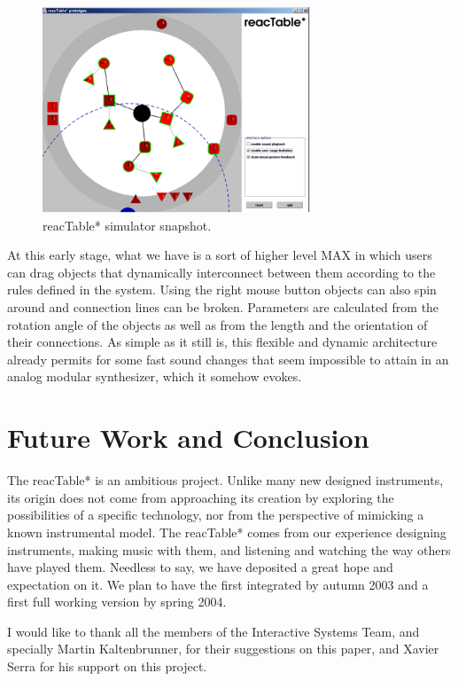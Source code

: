 \begin{figure}[t]
\centering
\includegraphics[width=8cm]{Fig8.png}
\caption{reacTable*  simulator snapshot.}
\label{Jorda:fig:reactable-simulator} 
\end{figure}

At this early stage, what we have is  a sort  of higher  level MAX in which
users can drag objects that dynamically interconnect between them according to 
the  rules  defined  in the system. Using the right mouse button objects can
also spin around and connection lines can be broken. Parameters are calculated
from the  rotation angle of  the  objects as  well  as from the length and the orientation of their connections. As simple as it still is, this flexible and dynamic architecture already permits for some fast sound changes that seem impossible to attain in an analog modular synthesizer, which it somehow evokes.

\section {Future Work and Conclusion}

The reacTable*  is an ambitious project. Unlike  many new designed instruments,
its origin does not come from approaching its creation by exploring the
possibilities of a specific technology, nor from the perspective of mimicking a
known instrumental model. The reacTable* comes from our experience designing 
instruments,  making  music  with  them, and listening and watching the way
others have played them. Needless to say, we have deposited a great hope and
expectation on  it.  We  plan  to  have  the  first  integrated  by autumn 2003
and a first full working version by spring 2004.

\begin{acknowledgement}
I would like to thank all the members of the Interactive Systems Team, and
specially  Martin  Kaltenbrunner, for their suggestions on this paper, and Xavier
Serra for his support on this project.
\end{acknowledgement}

